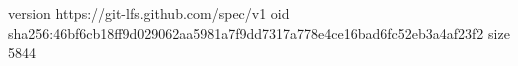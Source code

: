 version https://git-lfs.github.com/spec/v1
oid sha256:46bf6cb18ff9d029062aa5981a7f9dd7317a778e4ce16bad6fc52eb3a4af23f2
size 5844
